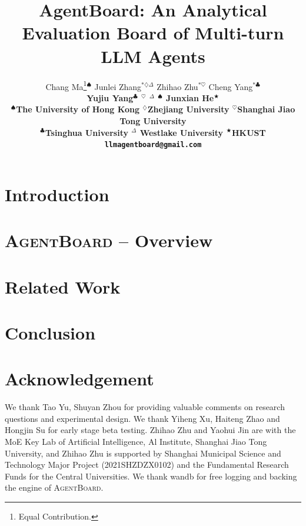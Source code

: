 \documentclass{article}
\title{AgentBoard: An Analytical Evaluation Board of Multi-turn LLM Agents }
\author{Chang Ma\thanks{Equal Contribution. 
}\hspace{4pt}$^{\spadesuit}$ \quad Junlei Zhang$^{*\diamondsuit\Delta}$
\quad Zhihao Zhu$^{*\heartsuit}$ \quad Cheng Yang$^{*\clubsuit}$ \\
\bf{Yujiu Yang}$^\clubsuit$ \quad {\bf Yaohui Jin}$^\heartsuit$ \quad {\bf Zhenzhong Lan}$^{\Delta}$ \quad {\bf Lingpeng Kong}$^\spadesuit$ \quad 
{\bf Junxian He}$^\bigstar$
 \\
$^\spadesuit$The University of Hong Kong \quad 
$^\diamondsuit$Zhejiang University \quad $^\heartsuit$Shanghai Jiao Tong University \\$^\clubsuit$Tsinghua University \quad $^\Delta$ Westlake University \quad 
$^\bigstar$HKUST \\
\texttt{llmagentboard@gmail.com}
}
\newcommand{\BenchName}{\textsc{AgentBoard}}
\newcommand{\jh}[1]{\textcolor{magenta}{\bf\small [#1 --JH]}}
\begin{document}
\maketitle

\begin{abstract}

\end{abstract}

\section{Introduction}


\section{\BenchName{} -- Overview}
\label{sec:overview}










\vspace{-2mm}
\section{Related Work}


\section{Conclusion\label{sec: limitation}}




\section*{Acknowledgement}
We thank Tao Yu, Shuyan Zhou for providing valuable comments on research questions and experimental design. 
We thank Yiheng Xu, Haiteng Zhao and Hongjin Su for early stage beta testing. 
Zhihao Zhu and Yaohui Jin are with the MoE Key Lab of Artificial Intelligence, Al Institute, Shanghai Jiao Tong University, and Zhihao Zhu is supported by Shanghai Municipal Science and Technology  Major Project (2021SHZDZX0102) and the
Fundamental Research Funds for the Central Universities. We
thank wandb for free logging and backing the engine of \BenchName{}.
\end{document}
